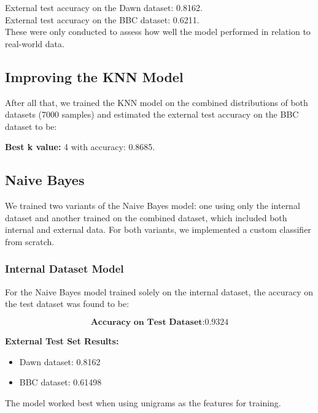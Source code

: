 \documentclass[sigconf]{acmart}
\begin{document}
External test accuracy on the Dawn dataset: 0.8162. \\
External test accuracy on the BBC dataset: 0.6211. \\
These were only conducted to assess how well the model performed in relation to real-world data.

\subsection{Improving the KNN Model}

After all that, we trained the KNN model on the combined distributions of both datasets (7000 samples) and estimated the external test accuracy on the BBC dataset to be:

\textbf{Best k value:} 4 with accuracy: 0.8685.

\subsection{Naive Bayes}

We trained two variants of the Naive Bayes model: one using only the internal dataset and another trained on the combined dataset, which included both internal and external data. For both variants, we implemented a custom classifier from scratch.

\subsubsection{Internal Dataset Model}

For the Naive Bayes model trained solely on the internal dataset, the accuracy on the test dataset was found to be:

\[
\textbf{Accuracy on Test Dataset:} 0.9324
\]

\textbf{External Test Set Results:}
\begin{itemize}
    \item Dawn dataset: 0.8162
    \item BBC dataset: 0.61498
\end{itemize}

The model worked best when using unigrams as the features for training.

\end{document}
